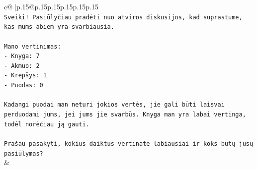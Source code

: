 \documentclass{article}
\begin{document}
{\begin{supertabular}{c@{$\;$}|p{.15\linewidth}@{}p{.15\linewidth}p{.15\linewidth}p{.15\linewidth}p{.15\linewidth}p{.15\linewidth}}
{{{\\ 
\texttt{Sveiki! Pasiūlyčiau pradėti nuo atviros diskusijos, kad suprastume, kas mums abiem yra svarbiausia.} \\
\\ 
\texttt{Mano vertinimas:} \\
\texttt{{-} Knyga: 7} \\
\texttt{{-} Akmuo: 2} \\
\texttt{{-} Krepšys: 1} \\
\texttt{{-} Puodas: 0} \\
\\ 
\texttt{Kadangi puodai man neturi jokios vertės, jie gali būti laisvai perduodami jums, jei jums jie svarbūs. Knyga man yra labai vertinga, todėl norėčiau ją gauti.} \\
\\ 
\texttt{Prašau pasakyti, kokius daiktus vertinate labiausiai ir koks būtų jūsų pasiūlymas?} \\
            }
        }
    }
    & \\ \\


\end{supertabular}}
\end{document}
